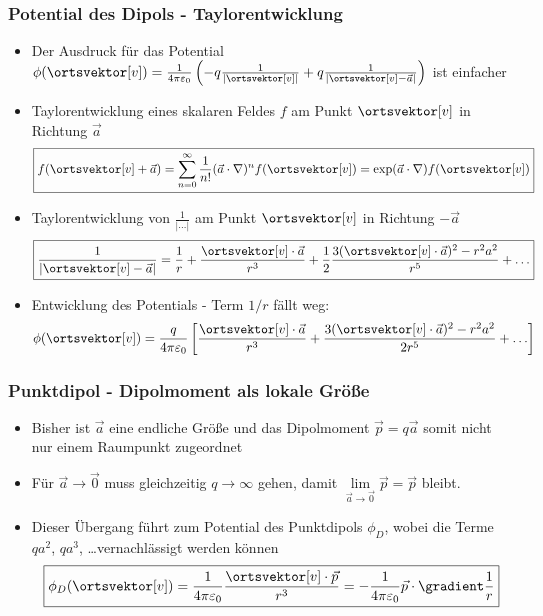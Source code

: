 \begin{frame}
\begin{columns}[T]
\begin{column}{.7\linewidth}
    \vspace*{-.3cm}\ 
    \onslide<4->{\centering{\resizebox{.7\columnwidth}{!}{ } }} 
      \end{column}
\end{columns}
\end{frame}

\begin{frame}
  \frametitle{Potential des Dipols - Taylorentwicklung}
\begin{itemize}[<+->]
\item Der Ausdruck für das Potential $\phi (\ortsvektor[v]) =  \frac{1}{4\pi\varepsilon_0} \left( -q\frac{1}{|\ortsvektor[v]|}  + q\frac{1}{|\ortsvektor[v]-\vec{a}|} \right)$ ist einfacher
\item \alert{Taylorentwicklung} eines skalaren Feldes $f$ am Punkt $\ortsvektor[v]$ in Richtung $\vec{a}$
  $$
\boxed{  f(\ortsvektor[v]+\vec{a}) = \sum_{n=0}^\infty \frac{1}{n!} (\vec{a} \cdot \nabla)^n f(\ortsvektor[v]) = \exp(\vec{a} \cdot \nabla) f(\ortsvektor[v]) } 
  $$
\item \alert{Taylorentwicklung} von $\frac{1}{|\dots|}$ am Punkt $\ortsvektor[v]$ in Richtung $-\vec{a}$
  $$
  \boxed{\frac{1}{|\ortsvektor[v]-\vec{a}|} = \frac{1}{r} + \frac{\ortsvektor[v]\cdot\vec{a}}{r^3} + \frac{1}{2} \frac{3(\ortsvektor[v]\cdot\vec{a})^2-r^2a^2}{r^5} + \ldots }
  $$
\item Entwicklung des Potentials - Term $1/r$ fällt weg:
  $$
  \phi (\ortsvektor[v]) =  \frac{q}{4\pi\varepsilon_0} \left[ \frac{\ortsvektor[v]\cdot\vec{a}}{r^3} + \frac{3(\ortsvektor[v]\cdot\vec{a})^2-r^2a^2}{2r^5} + \ldots \right] 
  $$
  
\end{itemize}
\end{frame}

\begin{frame}
  \frametitle{Punktdipol - Dipolmoment als lokale Größe}
  \begin{itemize}[<+->]
  \item Bisher ist $\vec{a}$ eine endliche Größe und das Dipolmoment $\vec{p} = q \vec{a}$ somit nicht nur einem Raumpunkt zugeordnet
  \item Für $\vec{a}\to \vec{0}$ muss gleichzeitig $q\to\infty$ gehen, damit $\lim \limits_{\vec{a}\to \vec{0}}\vec{p} =\vec{p}$ bleibt.
  \item Dieser Übergang führt zum \alert{Potential des Punktdipols} $\phi_D$, wobei die Terme $qa^2$, $qa^3$, \dots vernachlässigt werden können
    $$
    \boxed{\phi_D(\ortsvektor[v]) = \frac{1}{4\pi\varepsilon_0} \frac{\ortsvektor[v]\cdot\vec{p}}{r^3} = -\frac{1}{4\pi\varepsilon_0} \vec{p}\cdot\gradient \frac{1}{r} }
    $$
    \end{itemize}
  \end{frame}

